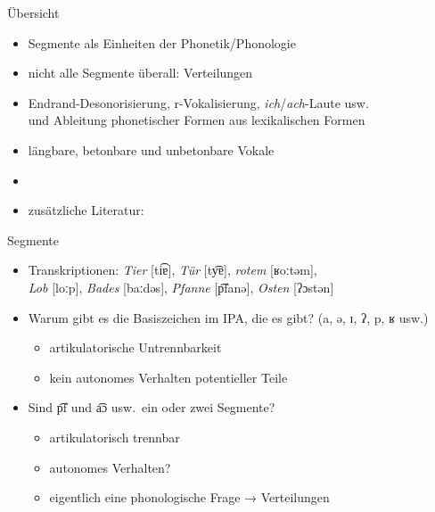 \begin{frame}
  {Übersicht}
  \pause
  \begin{itemize}[<+->]
    \item \alert{Segmente} als Einheiten der Phonetik\slash Phonologie
    \item nicht alle Segmente überall: \alert{Verteilungen}
    \item Endrand-Desonorisierung, r-Vokalisierung, \textit{ich}\slash\textit{ach}-Laute usw.\\
      und \alert{Ableitung} phonetischer Formen aus lexikalischen Formen
    \item längbare, betonbare und unbetonbare Vokale
      \Zeile
    \item \citet[Abschnitt~5.1]{Schaefer2018b}
    \item zusätzliche Literatur: \citet{Eisenberg2013a}
  \end{itemize}
\end{frame}


\begin{frame}
  {Segmente}
  \pause
  \begin{itemize}[<+->]
    \item Transkriptionen: \textit{Tier} [ti͡ɐ], \textit{Tür} [ty͡ɐ], \textit{rotem} [ʁoːtəm],\\
      \textit{Lob} [loːp], \textit{Bades} [baːdəs], \textit{Pfanne} [p͡fanə], \textit{Osten} [ʔɔstən]
      \vspace{\baselineskip}
    \item Warum gibt es die Basiszeichen im IPA, die es gibt? (a, ə, ɪ, ʔ, p, ʁ usw.)
      \begin{itemize}
        \item \alert{artikulatorische Untrennbarkeit}
        \item \alert{kein autonomes Verhalten potentieller Teile}
      \end{itemize}
      \vspace{\baselineskip}
    \item Sind p͡f und a͡ɔ usw.\ ein oder zwei Segmente? 
      \begin{itemize}
        \item artikulatorisch trennbar
        \item autonomes Verhalten?
        \item eigentlich eine phonologische Frage → Verteilungen
      \end{itemize}
  \end{itemize}
\end{frame}

